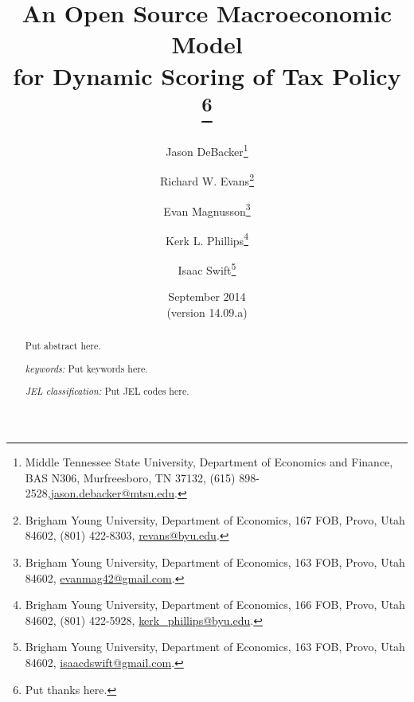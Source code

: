 \documentclass[letterpaper,12pt]{article}
\theoremstyle{definition}
\begin{document}
\begin{titlepage}
\title{An Open Source Macroeconomic Model \\
       for Dynamic Scoring of Tax Policy
       \thanks{
       Put thanks here.}
       }
\author{
  Jason DeBacker\footnote{Middle Tennessee State University, Department of Economics and Finance, BAS N306, Murfreesboro, TN 37132, (615) 898-2528,\href{mailto:jason.debacker@mtsu.edu}{jason.debacker@mtsu.edu}.} \\[-2pt]
  \and
  Richard W. Evans\footnote{Brigham Young University, Department of Economics, 167 FOB, Provo, Utah 84602, (801) 422-8303, \href{mailto:revans@byu.edu}{revans@byu.edu}.} \\[-2pt]
  \and
  Evan Magnusson\footnote{Brigham Young University, Department of Economics, 163 FOB, Provo, Utah 84602, \href{mailto:evanmag42@gmail.com}{evanmag42@gmail.com}.} \\[-2pt]
  \and
  Kerk L. Phillips\footnote{Brigham Young University, Department of Economics, 166 FOB, Provo, Utah 84602, (801) 422-5928, \href{mailto:kerk_phillips@byu.edu}{kerk\_phillips@byu.edu}.} \\[-2pt]
  \and
  Isaac Swift\footnote{Brigham Young University, Department of Economics, 163 FOB, Provo, Utah 84602, \href{mailto:isaacdswift@gmail.com}{isaacdswift@gmail.com}.} \\[-2pt]}
\date{September 2014 \\
  \scriptsize{(version 14.09.a)}}
\maketitle
\begin{abstract}
\normalsize{Put abstract here.

\vspace{3mm}

\noindent\textit{keywords:}\: Put keywords here.

\vspace{3mm}

\noindent\textit{JEL classification:} Put JEL codes here.}
\end{abstract}
\thispagestyle{empty}
\end{titlepage}
\end{document}
